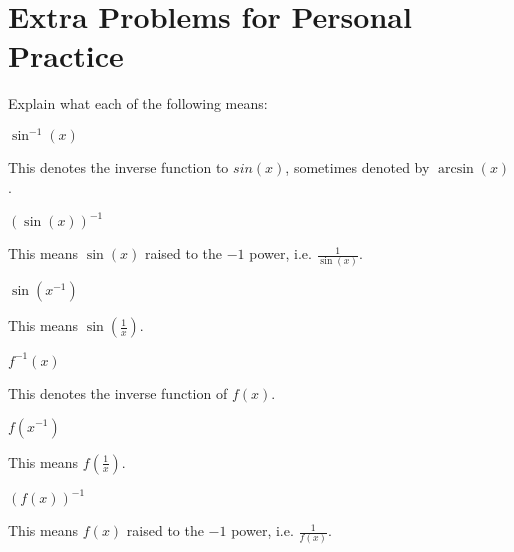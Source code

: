 \documentclass[handout,nooutcomes]{ximera}
\renewenvironment{freeResponse}{
\ifhandout\setbox0\vbox\bgroup\else
\begin{trivlist}\item[\hskip \labelsep\bfseries Solution:\hspace{2ex}]
\fi}
{\ifhandout\egroup\else
\end{trivlist}
\fi}
\begin{document}
\section{Extra Problems for Personal Practice}
Explain what each of the following means:
\begin{problem}[warmup]
  \mbox{}
  \begin{enumerate}
	
  \item $\sin^{-1}(x)$
    \begin{freeResponse}
      This denotes the inverse function to $sin(x)$, sometimes denoted
      by $\arcsin(x)$.
    \end{freeResponse}
		
  \item $\left( \sin(x) \right)^{-1}$
    \begin{freeResponse}
      This means $\sin(x)$ raised to the $-1$ power,
      i.e. $\frac{1}{\sin(x)}$.
    \end{freeResponse}
		
  \item $\sin \left(x^{-1} \right)$
    \begin{freeResponse}
      This means $\sin \left( \frac{1}{x} \right)$.
    \end{freeResponse}
		
  \item $f^{-1}(x)$
    \begin{freeResponse}
      This denotes the inverse function of $f(x)$.
    \end{freeResponse}
		
  \item $f(x^{-1})$
    \begin{freeResponse}
      This means $f \left( \frac{1}{x} \right)$.
    \end{freeResponse}
		
  \item $\left( f(x) \right)^{-1}$
    \begin{freeResponse}
      This means $f(x)$ raised to the $-1$ power,
      i.e. $\frac{1}{f(x)}$.
    \end{freeResponse}
  \end{enumerate}
\end{problem}
\end{document}
